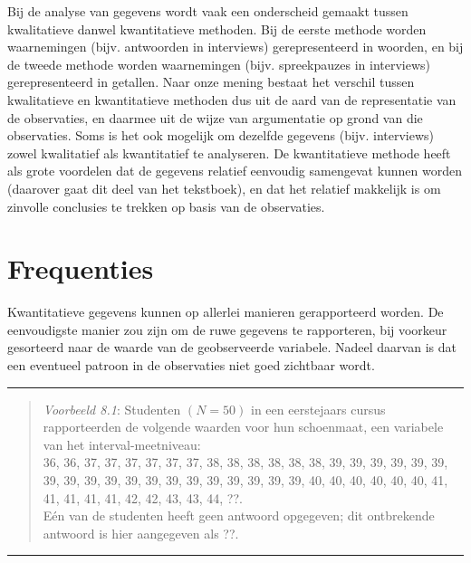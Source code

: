 \documentclass[
]{book}
\begin{document}
Bij de analyse van gegevens wordt vaak een onderscheid gemaakt tussen
kwalitatieve danwel kwantitatieve methoden. Bij de eerste methode worden
waarnemingen (bijv. antwoorden in interviews) gerepresenteerd in
woorden, en bij de tweede methode worden waarnemingen (bijv.
spreekpauzes in interviews) gerepresenteerd in getallen. Naar onze
mening bestaat het verschil tussen kwalitatieve en kwantitatieve
methoden dus uit de aard van de representatie van de observaties, en
daarmee uit de wijze van argumentatie op grond van die observaties. Soms
is het ook mogelijk om dezelfde gegevens (bijv. interviews) zowel
kwalitatief als kwantitatief te analyseren. De kwantitatieve methode
heeft als grote voordelen dat de gegevens relatief eenvoudig samengevat
kunnen worden (daarover gaat dit deel van het tekstboek), en dat het
relatief makkelijk is om zinvolle conclusies te trekken op basis van de
observaties.

\hypertarget{sec:frequenties}{%
\section{Frequenties}\label{sec:frequenties}}

Kwantitatieve gegevens kunnen op allerlei manieren gerapporteerd worden.
De eenvoudigste manier zou zijn om de ruwe gegevens te rapporteren, bij
voorkeur gesorteerd naar de waarde van de geobserveerde variabele.
Nadeel daarvan is dat een eventueel patroon in de observaties niet goed
zichtbaar wordt.

\begin{center}\rule{0.5\linewidth}{0.5pt}\end{center}

\begin{quote}
\emph{Voorbeeld 8.1}: Studenten \((N=50)\) in een eerstejaars
cursus rapporteerden de volgende waarden voor hun schoenmaat, een
variabele van het interval-meetniveau:\\
36, 36, 37, 37, 37, 37, 37, 37, 38, 38, 38, 38, 38, 38, 39, 39, 39, 39,
39, 39, 39, 39, 39, 39, 39, 39, 39, 39, 39, 39, 39, 39, 39, 40, 40, 40,
40, 40, 40, 41, 41, 41, 41, 41, 42, 42, 43, 43, 44, ??.\\
Eén van de studenten heeft geen antwoord opgegeven; dit ontbrekende
antwoord is hier aangegeven als ??.
\end{quote}

\begin{center}\rule{0.5\linewidth}{0.5pt}\end{center}
\end{document}
